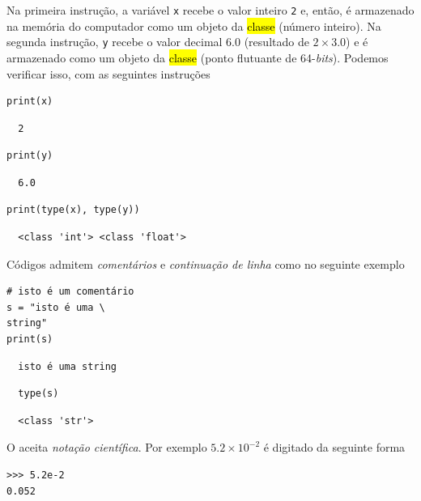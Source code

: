 \documentclass[12pt]{article}
\begin{document}
Na primeira instrução, a variável \texttt{x} recebe o valor inteiro \texttt{2} e, então, é armazenado na memória do computador como um objeto da \hl{classe {\PYTHONint}} (número inteiro). Na segunda instrução, \texttt{y} recebe o valor decimal $6.0$ (resultado de $2\times 3.0$) e é armazenado como um objeto da \hl{classe {\PYTHONfloat}} (ponto flutuante de 64-{\it bits}). Podemos verificar isso, com as seguintes instruções

\begin{lstlisting}
print(x)
\end{lstlisting}

\begin{verbatim}
  2
\end{verbatim}

\begin{lstlisting}
print(y)
\end{lstlisting}

\begin{verbatim}
  6.0
\end{verbatim}

\begin{lstlisting}
print(type(x), type(y))
\end{lstlisting}

\begin{verbatim}
  <class 'int'> <class 'float'>
\end{verbatim}

\begin{obs}
  Códigos {\python} admitem \emph{comentários} e \emph{continuação de linha} como no seguinte exemplo

\begin{lstlisting}
# isto é um comentário
s = "isto é uma \
string"
print(s)
\end{lstlisting}

\begin{verbatim}
  isto é uma string
\end{verbatim}

\begin{lstlisting}
  type(s)
\end{lstlisting}

\begin{verbatim}
  <class 'str'>
\end{verbatim}

\end{obs}

\begin{obs}
  O {\python} aceita \emph{notação científica}. Por exemplo $5.2\times 10^{-2}$ é digitado da seguinte forma

\begin{lstlisting}
>>> 5.2e-2
0.052
\end{lstlisting}

\end{obs}
\end{document}
